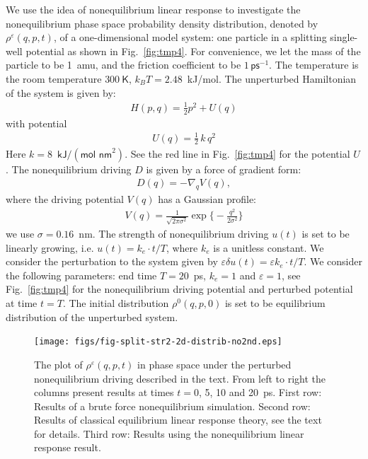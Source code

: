 \documentclass[]{tMPH2e}
\newcommand{\eps}{\varepsilon}
\begin{document}
We use the idea of nonequilibrium linear response to investigate the
nonequilibrium phase space probability density distribution, denoted by $\rho^\eps(q, p, t)$, of a one-dimensional model system: one particle in a
splitting single-well potential as shown in Fig.~\ref{fig:tmp4}.  For convenience, we let the mass of
the particle to be 1~\textsf{amu}, and the friction coefficient to be
$1\,\textsf{ps}^{-1}$.
The temperature is the
room temperature $300\ \textsf{K}$, $k_BT = 2.48$~\textsf{kJ/mol}.
The unperturbed Hamiltonian of the system is
given by:
\begin{align}
  H ( p,  q) = \frac 12  p^2 + U( q) 
\end{align}
with potential
\begin{align}
  U( q) = \frac12\,k\, q^2 
\end{align}
Here $k = 8$~$\textsf{kJ} / (\textsf{mol nm}^2)$.
See the red line in Fig.~\ref{fig:tmp4} for the  potential $U$.
The nonequilibrium driving $ D$ is given by a force of gradient form:
\begin{align}
   D( q) = -\nabla_{ q} V( q) ,
\end{align}
where the driving potential $V( q)$ has a Gaussian profile:
\begin{align}
  V( q) = \frac{1}{\sqrt{2\pi \sigma^2}}
  \exp\Big\{-\frac{ q^2}{2\sigma^2}\Big\}
\end{align}
we use $\sigma = 0.16$~\textsf{nm}.  The strength of nonequilibrium
driving $u(t)$ is set to be linearly growing, i.e. $ u(t) = k_e\cdot t/T$,
where $k_e$ is a unitless constant.
We
consider the perturbation to the system given by $\eps\delta u(t) = \eps k_e \cdot t/T$.
We consider the following parameters: end time $T = 20$~\textsf{ps}, 
$k_e = 1$ and $\eps = 1$, see Fig.~\ref{fig:tmp4}
for the nonequilibrium driving potential and perturbed
potential at time $t = T$. The initial distribution $\rho^0(q, p, 0)$ is set to
be equilibrium distribution of the unperturbed system.

\begin{figure}
  \centering
  \texttt{[image: figs/fig-split-str2-2d-distrib-no2nd.eps]}
  \caption{ The plot of $ \rho^\eps(q,p,t)$ in  phase
    space under the perturbed nonequilibrium driving described in the text. From left to right the columns present results at times $t =
    0$, 5, 10 and 20~\textsf{ps}.  First row: Results of a brute force
    nonequilibrium simulation. Second row: Results of
    classical equilibrium linear response theory, see the text for details. Third row: Results using the
    nonequilibrium linear response result.  }
  \label{fig:tmp6}
\end{figure}
\end{document}
